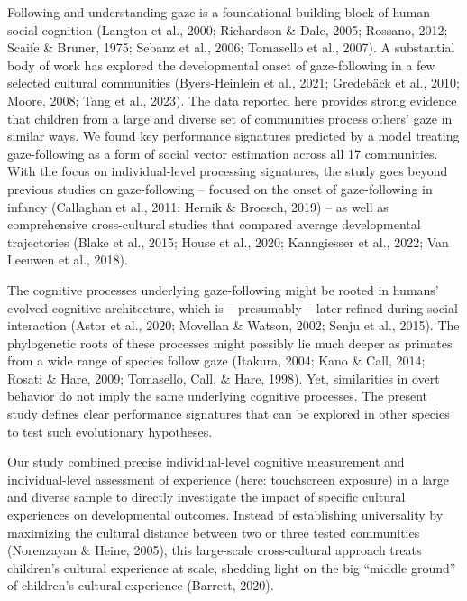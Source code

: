 \documentclass[
  man,floatsintext]{apa6}
\begin{document}
Following and understanding gaze is a foundational building block of human social cognition (Langton et al., 2000; Richardson \& Dale, 2005; Rossano, 2012; Scaife \& Bruner, 1975; Sebanz et al., 2006; Tomasello et al., 2007). A substantial body of work has explored the developmental onset of gaze-following in a few selected cultural communities (Byers-Heinlein et al., 2021; Gredebäck et al., 2010; Moore, 2008; Tang et al., 2023). The data reported here provides strong evidence that children from a large and diverse set of communities process others' gaze in similar ways. We found key performance signatures predicted by a model treating gaze-following as a form of social vector estimation across all 17 communities. With the focus on individual-level processing signatures, the study goes beyond previous studies on gaze-following -- focused on the onset of gaze-following in infancy (Callaghan et al., 2011; Hernik \& Broesch, 2019) -- as well as comprehensive cross-cultural studies that compared average developmental trajectories (Blake et al., 2015; House et al., 2020; Kanngiesser et al., 2022; Van Leeuwen et al., 2018).

The cognitive processes underlying gaze-following might be rooted in humans' evolved cognitive architecture, which is -- presumably -- later refined during social interaction (Astor et al., 2020; Movellan \& Watson, 2002; Senju et al., 2015). The phylogenetic roots of these processes might possibly lie much deeper as primates from a wide range of species follow gaze (Itakura, 2004; Kano \& Call, 2014; Rosati \& Hare, 2009; Tomasello, Call, \& Hare, 1998). Yet, similarities in overt behavior do not imply the same underlying cognitive processes. The present study defines clear performance signatures that can be explored in other species to test such evolutionary hypotheses.

Our study combined precise individual-level cognitive measurement and individual-level assessment of experience (here: touchscreen exposure) in a large and diverse sample to directly investigate the impact of specific cultural experiences on developmental outcomes. Instead of establishing universality by maximizing the cultural distance between two or three tested communities (Norenzayan \& Heine, 2005), this large-scale cross-cultural approach treats children's cultural experience at scale, shedding light on the big ``middle ground'' of children's cultural experience (Barrett, 2020).
\end{document}
